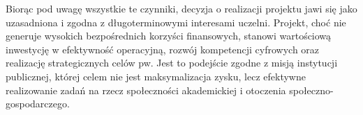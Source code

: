 Biorąc pod uwagę wszystkie te czynniki, decyzja o realizacji projektu jawi się jako uzasadniona i zgodna z długoterminowymi interesami uczelni. Projekt, choć nie generuje wysokich bezpośrednich korzyści finansowych, stanowi wartościową inwestycję w efektywność operacyjną, rozwój kompetencji cyfrowych oraz realizację strategicznych celów \gls{pw}. Jest to podejście zgodne z misją instytucji publicznej, której celem nie jest maksymalizacja zysku, lecz efektywne realizowanie zadań na rzecz społeczności akademickiej i otoczenia społeczno-gospodarczego.